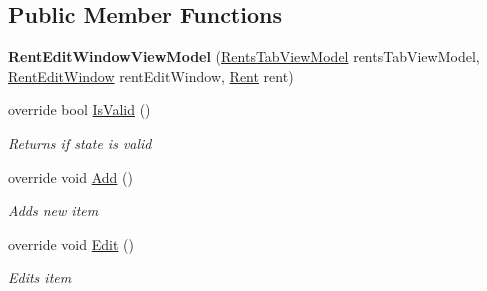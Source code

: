 \subsection*{Public Member Functions}
\begin{DoxyCompactItemize}
\item 
\hypertarget{class_baudi_1_1_client_1_1_view_models_1_1_edit_window_view_models_1_1_rent_edit_window_view_model_a7478e423660d01e75ac24256bdb2be76}{}{\bfseries Rent\+Edit\+Window\+View\+Model} (\hyperlink{class_baudi_1_1_client_1_1_view_models_1_1_tabs_view_models_1_1_rents_tab_view_model}{Rents\+Tab\+View\+Model} rents\+Tab\+View\+Model, \hyperlink{class_baudi_1_1_client_1_1_view_1_1_edit_windows_1_1_rent_edit_window}{Rent\+Edit\+Window} rent\+Edit\+Window, \hyperlink{class_baudi_1_1_d_a_l_1_1_models_1_1_rent}{Rent} rent)\label{class_baudi_1_1_client_1_1_view_models_1_1_edit_window_view_models_1_1_rent_edit_window_view_model_a7478e423660d01e75ac24256bdb2be76}

\item 
override bool \hyperlink{class_baudi_1_1_client_1_1_view_models_1_1_edit_window_view_models_1_1_rent_edit_window_view_model_a586d43a5e35825424caacad0478741a1}{Is\+Valid} ()
\begin{DoxyCompactList}\small\item\em Returns if state is valid \end{DoxyCompactList}\item 
override void \hyperlink{class_baudi_1_1_client_1_1_view_models_1_1_edit_window_view_models_1_1_rent_edit_window_view_model_ab31ba9da07db52336a1c351061142d4c}{Add} ()
\begin{DoxyCompactList}\small\item\em Adds new item \end{DoxyCompactList}\item 
override void \hyperlink{class_baudi_1_1_client_1_1_view_models_1_1_edit_window_view_models_1_1_rent_edit_window_view_model_ad2e1189fc38a45cfc458b6bae1af2284}{Edit} ()
\begin{DoxyCompactList}\small\item\em Edits item \end{DoxyCompactList}\end{DoxyCompactItemize}
